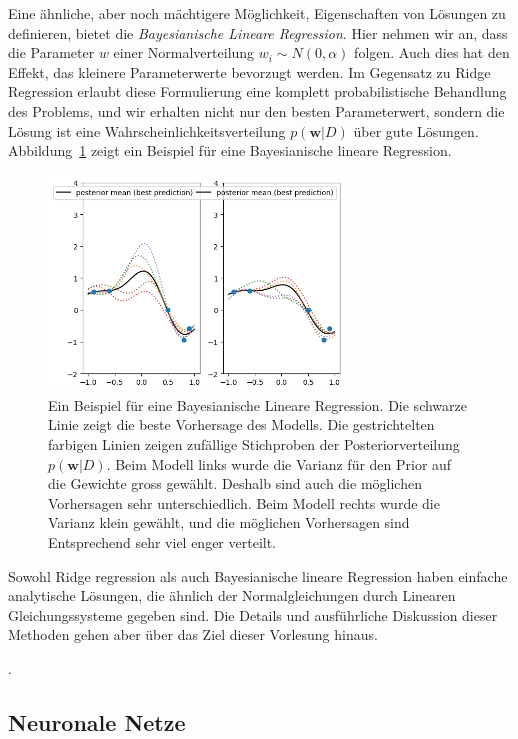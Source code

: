Eine ähnliche, aber noch mächtigere Möglichkeit, Eigenschaften von Lösungen zu definieren, bietet die 
\emph{Bayesianische Lineare Regression}. Hier nehmen wir an, dass die Parameter $w$ einer
Normalverteilung $w_i \sim N(0, \alpha)$ folgen. Auch dies hat den Effekt, das kleinere 
Parameterwerte bevorzugt werden. Im Gegensatz zu Ridge Regression erlaubt diese Formulierung 
eine komplett probabilistische Behandlung des Problems, und wir erhalten nicht nur den besten Parameterwert, sondern die Lösung ist  eine Wahrscheinlichkeitsverteilung $p(\textbf{w} | D)$ über gute Lösungen.
Abbildung~\ref{fig:ml-bayesian} zeigt	
ein Beispiel für eine Bayesianische lineare Regression. 
\begin{figure}[tb]
    \center
    \includegraphics[width=0.7\textwidth]{Figures/ML-bayesian-regr.png}
    \caption{Ein Beispiel für eine Bayesianische Lineare Regression. Die schwarze Linie zeigt die 
    beste Vorhersage des Modells. Die gestrichtelten farbigen Linien zeigen zufällige 
    Stichproben der Posteriorverteilung $p(\textbf{w} | D)$. Beim Modell links 
    wurde die Varianz für den Prior auf die Gewichte gross gewählt. Deshalb 
    sind auch die möglichen Vorhersagen sehr unterschiedlich. Beim Modell rechts
    wurde die Varianz klein gewählt, und die möglichen Vorhersagen sind Entsprechend
    sehr viel enger verteilt.}
    \label{fig:ml-bayesian}    
\end{figure}

Sowohl Ridge regression als auch Bayesianische lineare Regression haben einfache 
analytische Lösungen, die ähnlich der Normalgleichungen durch
Linearen Gleichungssysteme gegeben sind. Die Details und ausführliche Diskussion dieser 
Methoden gehen aber über das Ziel dieser Vorlesung hinaus. 

.

\subsection{Neuronale Netze}

